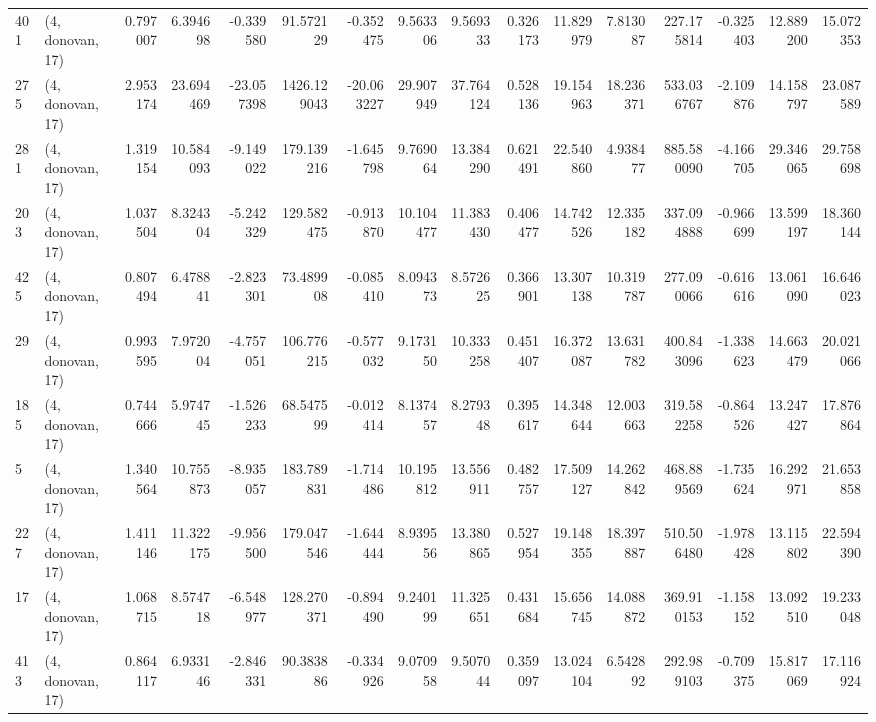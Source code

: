 \begin{tabular}{llrrrrrrrrrrrrrr}
401 &  (4, donovan, 17) &   0.797007 &   6.394698 &  -0.339580 &    91.572129 &  -0.352475 &   9.563306 &   9.569333 &  0.326173 &  11.829979 &   7.813087 &   227.175814 & -0.325403 &  12.889200 &  15.072353 \\
275 &  (4, donovan, 17) &   2.953174 &  23.694469 & -23.057398 &  1426.129043 & -20.063227 &  29.907949 &  37.764124 &  0.528136 &  19.154963 &  18.236371 &   533.036767 & -2.109876 &  14.158797 &  23.087589 \\
281 &  (4, donovan, 17) &   1.319154 &  10.584093 &  -9.149022 &   179.139216 &  -1.645798 &   9.769064 &  13.384290 &  0.621491 &  22.540860 &   4.938477 &   885.580090 & -4.166705 &  29.346065 &  29.758698 \\
203 &  (4, donovan, 17) &   1.037504 &   8.324304 &  -5.242329 &   129.582475 &  -0.913870 &  10.104477 &  11.383430 &  0.406477 &  14.742526 &  12.335182 &   337.094888 & -0.966699 &  13.599197 &  18.360144 \\
425 &  (4, donovan, 17) &   0.807494 &   6.478841 &  -2.823301 &    73.489908 &  -0.085410 &   8.094373 &   8.572625 &  0.366901 &  13.307138 &  10.319787 &   277.090066 & -0.616616 &  13.061090 &  16.646023 \\
29  &  (4, donovan, 17) &   0.993595 &   7.972004 &  -4.757051 &   106.776215 &  -0.577032 &   9.173150 &  10.333258 &  0.451407 &  16.372087 &  13.631782 &   400.843096 & -1.338623 &  14.663479 &  20.021066 \\
185 &  (4, donovan, 17) &   0.744666 &   5.974745 &  -1.526233 &    68.547599 &  -0.012414 &   8.137457 &   8.279348 &  0.395617 &  14.348644 &  12.003663 &   319.582258 & -0.864526 &  13.247427 &  17.876864 \\
5   &  (4, donovan, 17) &   1.340564 &  10.755873 &  -8.935057 &   183.789831 &  -1.714486 &  10.195812 &  13.556911 &  0.482757 &  17.509127 &  14.262842 &   468.889569 & -1.735624 &  16.292971 &  21.653858 \\
227 &  (4, donovan, 17) &   1.411146 &  11.322175 &  -9.956500 &   179.047546 &  -1.644444 &   8.939556 &  13.380865 &  0.527954 &  19.148355 &  18.397887 &   510.506480 & -1.978428 &  13.115802 &  22.594390 \\
17  &  (4, donovan, 17) &   1.068715 &   8.574718 &  -6.548977 &   128.270371 &  -0.894490 &   9.240199 &  11.325651 &  0.431684 &  15.656745 &  14.088872 &   369.910153 & -1.158152 &  13.092510 &  19.233048 \\
413 &  (4, donovan, 17) &   0.864117 &   6.933146 &  -2.846331 &    90.383886 &  -0.334926 &   9.070958 &   9.507044 &  0.359097 &  13.024104 &   6.542892 &   292.989103 & -0.709375 &  15.817069 &  17.116924 \\

\end{tabular}
